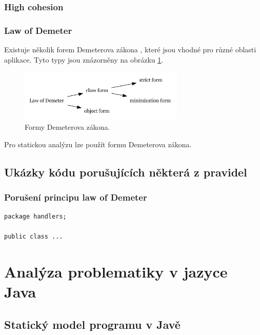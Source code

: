 \subsubsection{High cohesion}

\subsubsection{Law of Demeter}

Existuje několik forem Demeterova zákona \cite{35588}, které jsou vhodné pro různé oblasti aplikace. Tyto typy jsou znázorněny na obrázku \ref{demeter_law_types}.

\begin{figure}[h!]
\centering
\includegraphics[width=0.7\textwidth]{./graphs/demeter_law_types.png}
\caption{Formy Demeterova zákona.\label{demeter_law_types}}
\end{figure}

Pro statickou analýzu lze použít  formu Demeterova zákona.

\subsection{Ukázky kódu porušujících některá z pravidel}

\subsubsection{Porušení principu law of Demeter}

\begin{verbatim}
package handlers;

public class ...

\end{verbatim}

\section{Analýza problematiky v jazyce Java}

\subsection{Statický model programu v Javě}
